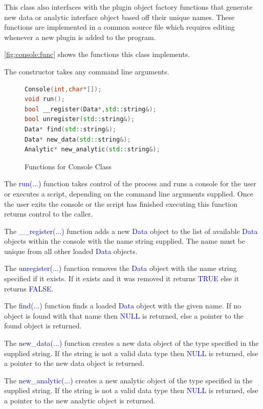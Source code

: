 \documentclass[10pt]{article}
\providecommand{\h}[1]{\textcolor{darkblue}{#1}}
\begin{document}
This class also interfaces with the plugin object factory functions that 
generate new data or analytic interface object based off their unique names. 
These functions are implemented in a common source file which requires editing 
whenever a new plugin is added to the program.

\autoref{fig:console:func} shows the functions this class implements.

The constructor takes any command line arguments.

\begin{figure}[H]
\begin{mdframed}[style=functions]
\begin{lstlisting}[language=C++]
Console(int,char*[]);
void run();
bool __register(Data*,std::string&);
bool unregister(std::string&);
Data* find(std::string&);
Data* new_data(std::string&);
Analytic* new_analytic(std::string&);
\end{lstlisting}
\end{mdframed}
\caption{Functions for Console Class}
\label{fig:console:func}
\end{figure}

The \h{run(...)} function takes control of the process and runs a console for 
the user or executes a script, depending on the command line arguments 
supplied. Once the user exits the console or the script has finished executing 
this function returns control to the caller.

The \h{\_\_register(...)} function adds a new \h{Data} object to the list of 
available \h{Data} objects within the console with the name string supplied. 
The name must be unique from all other loaded \h{Data} objects.

The \h{unregister(...)} function removes the \h{Data} object with the name 
string specified if it exists. If it exists and it was removed it returns 
\h{TRUE} else it returns \h{FALSE}.

The \h{find(...)} function finds a loaded \h{Data} object with the given name. 
If no object is found with that name then \h{NULL} is returned, else a 
pointer to the found object is returned.

The \h{new\_data(...)} function creates a new data object of the type 
specified in the supplied string. If the string is not a valid data type then 
\h{NULL} is returned, else a pointer to the new data object is returned.

The \h{new\_analytic(...)} creates a new analytic object of the type specified 
in the supplied string. If the string is not a valid data type then \h{NULL} is 
returned, else a pointer to the new analytic object is returned.
\end{document}
